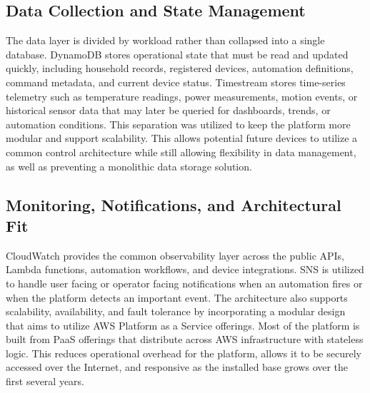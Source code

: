 \subsection{Data Collection and State Management}
The data layer is divided by workload rather than collapsed into a single database. DynamoDB stores operational state that must be read and updated quickly, including household records, registered devices, automation definitions, command metadata, and current device status. Timestream stores time-series telemetry such as temperature readings, power measurements, motion events, or historical sensor data that may later be queried for dashboards, trends, or automation conditions. This separation was utilized to keep the platform more modular and support scalability. This allows potential future devices to utilize a common control architecture while still allowing flexibility in data management, as well as preventing a monolithic data storage solution.

\subsection{Monitoring, Notifications, and Architectural Fit}

CloudWatch provides the common observability layer across the public APIs, Lambda functions, automation workflows, and device integrations. SNS is utilized to handle user facing or operator facing notifications when an automation fires or when the platform detects an important event. The architecture also supports scalability, availability, and fault tolerance by incorporating a modular design that aims to utilize AWS Platform as a Service offerings. Most of the platform is built from PaaS offerings that distribute across AWS infrastructure with stateless logic. This reduces operational overhead for the platform, allows it to be securely accessed over the Internet, and responsive as the installed base grows over the first several years.
